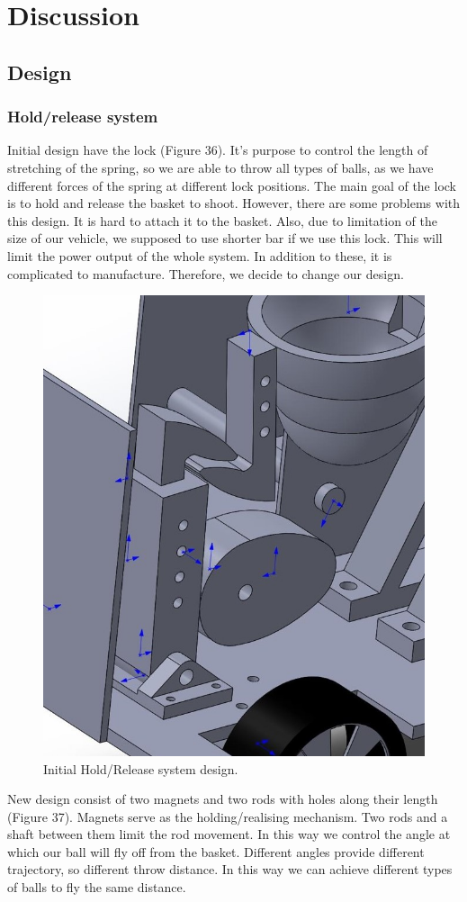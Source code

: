 \documentclass{article}
\begin{document}
\section{Discussion}
\subsection{Design}
\subsubsection*{Hold/release system}


Initial design have the lock (Figure 36). It's purpose to control the length of stretching of the spring, so we are able to throw all types of balls, as we have different forces of the spring at different lock positions. The main goal of the lock is to hold and release the basket to shoot. However, there are some problems with this design. It is hard to attach it to the basket. Also, due to limitation of the size of our vehicle, we supposed to use shorter bar if we use this lock. This will limit the power output of the whole system. In addition to these, it is complicated to manufacture. Therefore, we decide to change our design. 


\begin{figure}[H]
\centering
\includegraphics[width=0.3\linewidth]{Lock}
\caption{Initial Hold/Release system design.}
\end{figure}

\par
New design consist of two magnets and two rods with holes along their length (Figure 37). Magnets serve as the holding/realising mechanism. Two rods and a shaft between them limit the rod movement. In this way we control the angle at which our ball will fly off from the basket. Different angles provide different trajectory, so different throw distance. In this way we can achieve different types of balls to fly the same distance. 
\end{document}
